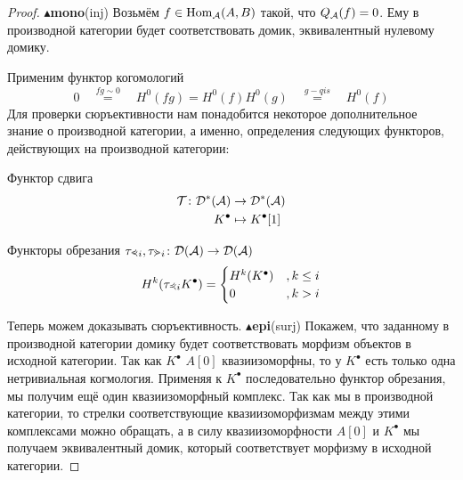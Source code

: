\documentclass[../main.tex]{subfiles}
\begin{document}
\begin{proof}
$\blacktriangle$\textbf{mono}(inj)
Возьмём $f \in \operatorname{Hom}_{\mathcal{A}}(A, B)$ такой, что $Q_{\mathcal{A}}(f) = 0$. Ему в производной категории будет соответствовать домик, эквивалентный нулевому домику. 
\bee
{} 
\qquad
{} 
\eee
Применим функтор когомологий 
\[
0\quad \overset{fg\sim0}{=}\quad H^0 (fg) = H^0(f) H^0(g)\quad \overset{g-qis}{=}\quad H^0(f) 
\]
Для проверки сюръективности нам понадобится некоторое дополнительное знание о производной категории, а именно, определения следующих функторов, действующих на производной категории:
\begin{to_def}
Функтор сдвига
\begin{align*}
\mathcal{T}\colon \mathcal{D^{*}(A)}& \to \mathcal{D^{*}(A)}\\
 K^\bullet& \mapsto K^\bullet[1]
\end{align*}
\end{to_def}
\begin{to_def}
Функторы обрезания $\tau_{ \curlyeqprec i}, \tau_{ \curlyeqsucc i} \colon \mathcal{D(A)} \to \mathcal{D(A)}$
\[
H^k(\tau_{ \curlyeqprec i} K^\bullet) = \begin{cases}H^k(K^\bullet) &, k \le i \\ 0 &, k>i \end{cases}
\]
\bee
{}
\qquad
{}
\eee
\end{to_def}
Теперь можем доказывать сюръективность.
$\blacktriangle$\textbf{epi}(surj) Покажем, что заданному в производной категории домику будет соответствовать морфизм объектов в исходной категории. Так как $K^\bullet$ $A[0]$ квазиизоморфны, то у $K^\bullet$ есть только одна нетривиальная когмология. Применяя к $K^\bullet$ последовательно функтор обрезания, мы получим ещё один квазиизоморфный комплекс. Так как мы в производной категории, то стрелки соответствующие квазиизоморфизмам между этими комплексами можно обращать, а в силу квазиизоморфности $A[0]$ и $K^\bullet$ мы получаем эквивалентный домик, который соответствует морфизму в исходной категории.

\end{proof}
\end{document}
